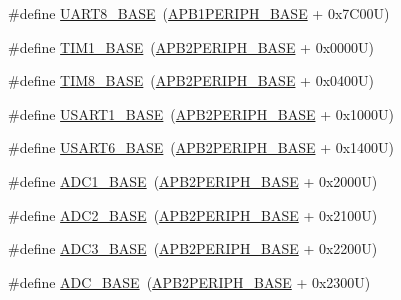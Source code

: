 \begin{DoxyCompactItemize}
\item 
\#define \hyperlink{group___peripheral__memory__map_gac9c6cd59a248941d9d2462ab21a2346e}{U\+A\+R\+T8\+\_\+\+B\+A\+SE}~(\hyperlink{group___peripheral__memory__map_ga45666d911f39addd4c8c0a0ac3388cfb}{A\+P\+B1\+P\+E\+R\+I\+P\+H\+\_\+\+B\+A\+SE} + 0x7\+C00\+U)
\item 
\#define \hyperlink{group___peripheral__memory__map_gaf8aa324ca5011b8173ab16585ed7324a}{T\+I\+M1\+\_\+\+B\+A\+SE}~(\hyperlink{group___peripheral__memory__map_ga25b99d6065f1c8f751e78f43ade652cb}{A\+P\+B2\+P\+E\+R\+I\+P\+H\+\_\+\+B\+A\+SE} + 0x0000\+U)
\item 
\#define \hyperlink{group___peripheral__memory__map_ga5b72f698b7a048a6f9fcfe2efe5bc1db}{T\+I\+M8\+\_\+\+B\+A\+SE}~(\hyperlink{group___peripheral__memory__map_ga25b99d6065f1c8f751e78f43ade652cb}{A\+P\+B2\+P\+E\+R\+I\+P\+H\+\_\+\+B\+A\+SE} + 0x0400\+U)
\item 
\#define \hyperlink{group___peripheral__memory__map_ga86162ab3f740db9026c1320d46938b4d}{U\+S\+A\+R\+T1\+\_\+\+B\+A\+SE}~(\hyperlink{group___peripheral__memory__map_ga25b99d6065f1c8f751e78f43ade652cb}{A\+P\+B2\+P\+E\+R\+I\+P\+H\+\_\+\+B\+A\+SE} + 0x1000\+U)
\item 
\#define \hyperlink{group___peripheral__memory__map_gade4d3907fd0387ee832f426f52d568bb}{U\+S\+A\+R\+T6\+\_\+\+B\+A\+SE}~(\hyperlink{group___peripheral__memory__map_ga25b99d6065f1c8f751e78f43ade652cb}{A\+P\+B2\+P\+E\+R\+I\+P\+H\+\_\+\+B\+A\+SE} + 0x1400\+U)
\item 
\#define \hyperlink{group___peripheral__memory__map_ga695c9a2f892363a1c942405c8d351b91}{A\+D\+C1\+\_\+\+B\+A\+SE}~(\hyperlink{group___peripheral__memory__map_ga25b99d6065f1c8f751e78f43ade652cb}{A\+P\+B2\+P\+E\+R\+I\+P\+H\+\_\+\+B\+A\+SE} + 0x2000\+U)
\item 
\#define \hyperlink{group___peripheral__memory__map_ga6544abc57f9759f610eee09a02442ae6}{A\+D\+C2\+\_\+\+B\+A\+SE}~(\hyperlink{group___peripheral__memory__map_ga25b99d6065f1c8f751e78f43ade652cb}{A\+P\+B2\+P\+E\+R\+I\+P\+H\+\_\+\+B\+A\+SE} + 0x2100\+U)
\item 
\#define \hyperlink{group___peripheral__memory__map_gaca766f86c8e0b00a8e2b0224dcbb4c82}{A\+D\+C3\+\_\+\+B\+A\+SE}~(\hyperlink{group___peripheral__memory__map_ga25b99d6065f1c8f751e78f43ade652cb}{A\+P\+B2\+P\+E\+R\+I\+P\+H\+\_\+\+B\+A\+SE} + 0x2200\+U)
\item 
\#define \hyperlink{group___peripheral__memory__map_gad06cb9e5985bd216a376f26f22303cd6}{A\+D\+C\+\_\+\+B\+A\+SE}~(\hyperlink{group___peripheral__memory__map_ga25b99d6065f1c8f751e78f43ade652cb}{A\+P\+B2\+P\+E\+R\+I\+P\+H\+\_\+\+B\+A\+SE} + 0x2300\+U)

\end{DoxyCompactItemize}
